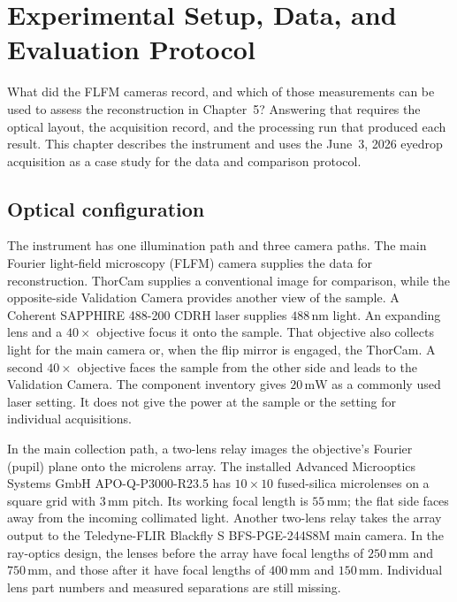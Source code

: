 \chapter{Experimental Setup, Data, and Evaluation Protocol}
\label{ch:experimental-setup}

What did the FLFM cameras record, and which of those measurements can be used
to assess the reconstruction in Chapter~5? Answering that requires the optical
layout, the acquisition record, and the processing run that produced each
result. This chapter describes the instrument and uses the June~3, 2026
eyedrop acquisition as a case study for the data and comparison protocol.

\section{Optical configuration}
\label{sec:optical-configuration}

The instrument has one illumination path and three camera paths. The main
Fourier light-field microscopy (FLFM) camera supplies the data for reconstruction. ThorCam supplies a
conventional image for comparison, while the opposite-side Validation Camera
provides another view of the sample. A Coherent
SAPPHIRE 488-200 CDRH laser supplies $488\,\mathrm{nm}$ light. An expanding
lens and a $40\times$ objective focus it onto the sample. That objective also
collects light for the main camera or, when the flip mirror is engaged, the
ThorCam. A second $40\times$ objective faces the sample from the other side
and leads to the Validation Camera. The component inventory gives
$20\,\mathrm{mW}$ as a commonly used laser setting. It does not give the
power at the sample or the setting for individual acquisitions.

In the main collection path, a two-lens relay images the objective's Fourier
(pupil) plane onto the microlens array. The installed Advanced Microoptics
Systems GmbH APO-Q-P3000-R23.5 has $10\times10$ fused-silica microlenses on
a square grid with $3\,\mathrm{mm}$ pitch. Its working focal length is
$55\,\mathrm{mm}$; the flat side faces away from the incoming collimated
light. Another two-lens relay takes the array output to the Teledyne-FLIR
Blackfly S BFS-PGE-244S8M main camera. In the ray-optics design, the lenses
before the array have focal lengths of $250\,\mathrm{mm}$ and
$750\,\mathrm{mm}$, and those after it have focal lengths of
$400\,\mathrm{mm}$ and $150\,\mathrm{mm}$.
Individual lens part numbers and measured separations are still missing.

